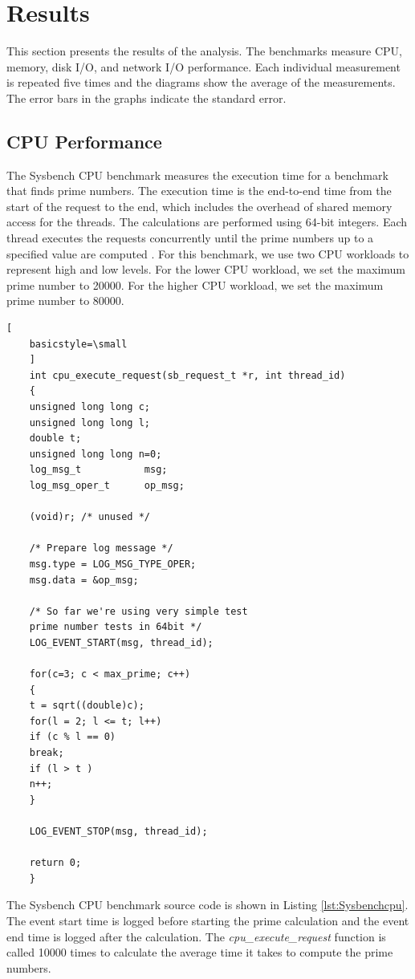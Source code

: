 \documentclass[11pt]{article}
\begin{document}
	\section{Results}
	This section presents the results of the analysis. The benchmarks measure CPU, memory, disk I/O, and network I/O performance. Each individual measurement is repeated five 
	times and the diagrams show the average of the measurements. The error bars in the graphs indicate the
	standard error.
	
	\subsection{CPU Performance}
	The Sysbench CPU benchmark measures the execution time for a benchmark that finds prime numbers. The execution time is the end-to-end time from the start of the request to the end, which includes the overhead of shared memory access for the threads. The calculations are performed using 64-bit integers. Each thread executes the requests concurrently until the prime numbers up to a specified value are computed \cite{kopytov}. For this benchmark, we use two CPU workloads to represent high and low levels. For the lower CPU workload, we set the maximum prime number to 20000. For the higher CPU workload, we set the maximum prime number to 80000. 
	
	\lstset{caption=Sysbench CPU Benchmark Source Code, label=lst:Sysbenchcpu}
	\begin{lstlisting}[
	basicstyle=\small
	]
	int cpu_execute_request(sb_request_t *r, int thread_id)
	{
	unsigned long long c;
	unsigned long long l;
	double t;
	unsigned long long n=0;
	log_msg_t           msg;
	log_msg_oper_t      op_msg;
	
	(void)r; /* unused */
	
	/* Prepare log message */
	msg.type = LOG_MSG_TYPE_OPER;
	msg.data = &op_msg;
	
	/* So far we're using very simple test 
	prime number tests in 64bit */
	LOG_EVENT_START(msg, thread_id);
	
	for(c=3; c < max_prime; c++)  
	{
	t = sqrt((double)c);
	for(l = 2; l <= t; l++)
	if (c % l == 0)
	break;
	if (l > t )
	n++; 
	}
	
	LOG_EVENT_STOP(msg, thread_id);
	
	return 0;
	}
	\end{lstlisting}
	
	The Sysbench CPU benchmark source code is shown in Listing \ref{lst:Sysbenchcpu}. The event start time is logged before starting the prime calculation and the event end time is logged after the calculation. The \textit{cpu\_execute\_request} function is called 10000 times to calculate the average time it takes to compute the prime numbers. 
	
\end{document}
